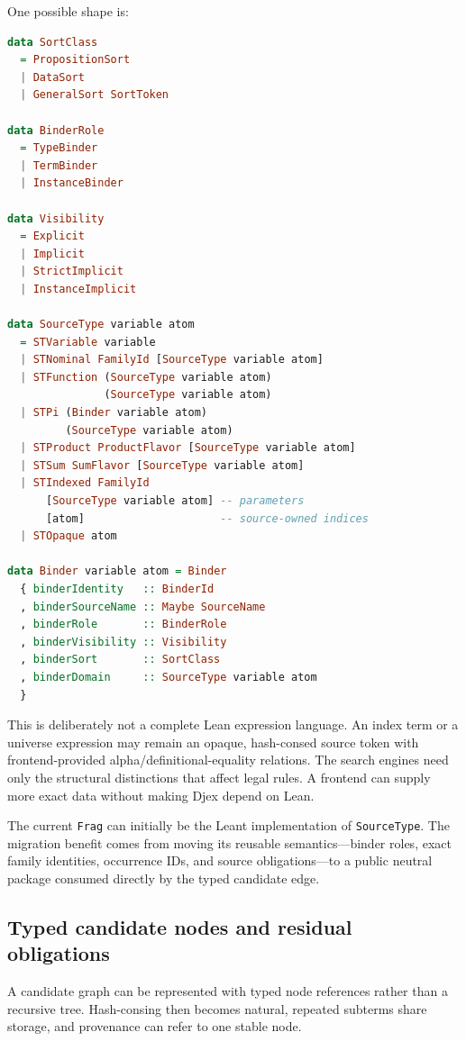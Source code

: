 \documentclass[11pt]{article}
\newcommand{\code}[1]{\texttt{#1}}
\newcommand{\Djex}{\textsf{Djex}}
\newcommand{\Leant}{\textsf{Leant}}
\begin{document}
One possible shape is:

\begin{lstlisting}[language=Haskell,caption={Sketch of a richer neutral source-semantic type.}]
data SortClass
  = PropositionSort
  | DataSort
  | GeneralSort SortToken

data BinderRole
  = TypeBinder
  | TermBinder
  | InstanceBinder

data Visibility
  = Explicit
  | Implicit
  | StrictImplicit
  | InstanceImplicit

data SourceType variable atom
  = STVariable variable
  | STNominal FamilyId [SourceType variable atom]
  | STFunction (SourceType variable atom)
               (SourceType variable atom)
  | STPi (Binder variable atom)
         (SourceType variable atom)
  | STProduct ProductFlavor [SourceType variable atom]
  | STSum SumFlavor [SourceType variable atom]
  | STIndexed FamilyId
      [SourceType variable atom] -- parameters
      [atom]                     -- source-owned indices
  | STOpaque atom

data Binder variable atom = Binder
  { binderIdentity   :: BinderId
  , binderSourceName :: Maybe SourceName
  , binderRole       :: BinderRole
  , binderVisibility :: Visibility
  , binderSort       :: SortClass
  , binderDomain     :: SourceType variable atom
  }
\end{lstlisting}

This is deliberately not a complete Lean expression language.  An index term
or a universe expression may remain an opaque, hash-consed source token with
frontend-provided alpha/definitional-equality relations.  The search engines
need only the structural distinctions that affect legal rules.  A frontend can
supply more exact data without making \Djex{} depend on Lean.

The current \code{Frag} can initially be the \Leant{} implementation of
\code{SourceType}.  The migration benefit comes from moving its reusable
semantics---binder roles, exact family identities, occurrence IDs, and source
obligations---to a public neutral package consumed directly by the typed
candidate edge.

\subsection{Typed candidate nodes and residual obligations}

A candidate graph can be represented with typed node references rather than a
recursive tree.  Hash-consing then becomes natural, repeated subterms share
storage, and provenance can refer to one stable node.
\end{document}
